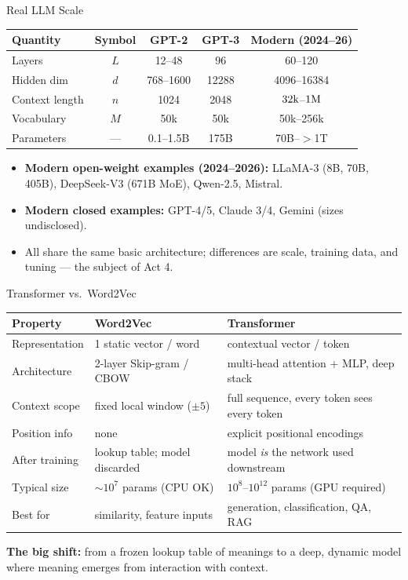 \begin{frame}{Real LLM Scale}
\begin{center}
\renewcommand{\arraystretch}{1.3}
\begin{tabular}{l c c c c}
\toprule
\textbf{Quantity} & \textbf{Symbol} & \textbf{GPT-2} & \textbf{GPT-3} & \textbf{Modern (2024--26)} \\
\midrule
Layers & $L$ & 12--48 & 96 & 60--120 \\
Hidden dim & $d$ & 768--1600 & 12288 & 4096--16384 \\
Context length & $n$ & 1024 & 2048 & $32{\rm k}$--$1{\rm M}$ \\
Vocabulary & $M$ & 50k & 50k & 50k--256k \\
Parameters & --- & 0.1--1.5B & 175B & 70B--$>$1T \\
\bottomrule
\end{tabular}
\end{center}

\medskip
\begin{itemize}
\item \textbf{Modern open-weight examples (2024--2026):} LLaMA-3 (8B, 70B, 405B), DeepSeek-V3 (671B MoE), Qwen-2.5, Mistral.
\item \textbf{Modern closed examples:} GPT-4/5, Claude 3/4, Gemini (sizes undisclosed).
\item All share the same basic architecture; differences are scale, training data, and tuning --- the subject of Act 4.
\end{itemize}
\end{frame}

\begin{frame}{Transformer vs.\ Word2Vec}
\begin{center}
\renewcommand{\arraystretch}{1.3}
\begin{tabular}{l l l}
\toprule
\textbf{Property} & \textbf{Word2Vec} & \textbf{Transformer} \\
\midrule
Representation & 1 static vector / word & contextual vector / token \\
Architecture & 2-layer Skip-gram / CBOW & multi-head attention + MLP, deep stack \\
Context scope & fixed local window ($\pm5$) & full sequence, every token sees every token \\
Position info & none & explicit positional encodings \\
After training & lookup table; model discarded & model \emph{is} the network used downstream \\
Typical size & $\sim10^{7}$ params (CPU OK) & $10^{8}$--$10^{12}$ params (GPU required) \\
Best for & similarity, feature inputs & generation, classification, QA, RAG \\
\bottomrule
\end{tabular}
\end{center}

\medskip
\textbf{The big shift:} from a frozen lookup table of meanings to a deep, dynamic model where meaning emerges from interaction with context.
\end{frame}

